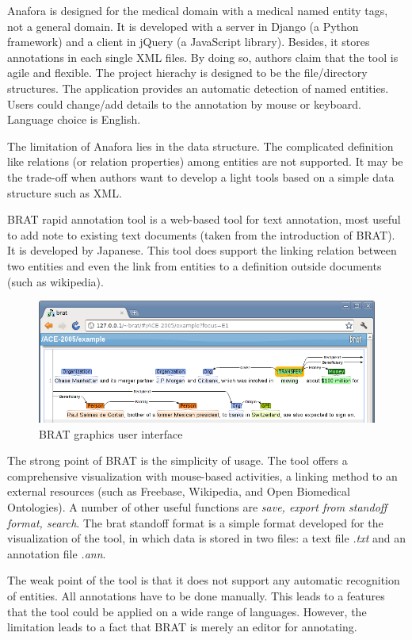 Anafora is designed for the medical domain with a medical named entity tags, not a general domain. It is developed with a server in Django (a Python framework) and a client in jQuery (a JavaScript 
library). Besides, it stores annotations in each single XML files. By doing so, authors claim that the tool is agile and 
flexible. The project hierachy is designed to be the file/directory structures. The application provides an automatic detection
of named entities. Users could change/add details to the annotation by mouse or keyboard. Language choice is English.

The limitation of Anafora lies in the data structure. The complicated definition like relations (or relation properties) 
among entities are not supported. It may be the trade-off when authors want to develop a light tools based on a simple
data structure such as XML.


BRAT rapid annotation tool is a web-based tool for text annotation, most useful to add note to existing text documents 
(taken from the introduction of BRAT). It is developed by Japanese. This tool does support the linking relation between 
two entities and even the link 
from entities to a definition outside documents (such as wikipedia).

\begin{figure}[!htb]
	\centering
	\includegraphics[width=\textwidth]{Images/brat}
	\caption{BRAT graphics user interface}
	\label{fig:Second}
\end{figure}

The strong point of BRAT is the simplicity of usage. The tool offers a comprehensive visualization with mouse-based 
activities, a linking method to an external resources (such as Freebase, Wikipedia, and Open Biomedical Ontologies). A number 
of other useful functions are \textit{save, export from standoff format, search}. The brat standoff format is a simple 
format developed for the visualization of the tool, in which data is stored in two files: a text file \textit{.txt} and an
annotation file \textit{.ann}.

The weak point of the tool is that it does not support any automatic recognition of entities. All annotations have to be
done manually. This leads to a features that the tool could be applied on a wide range of languages. However, the 
limitation leads to a fact that BRAT is merely an editor for annotating.

